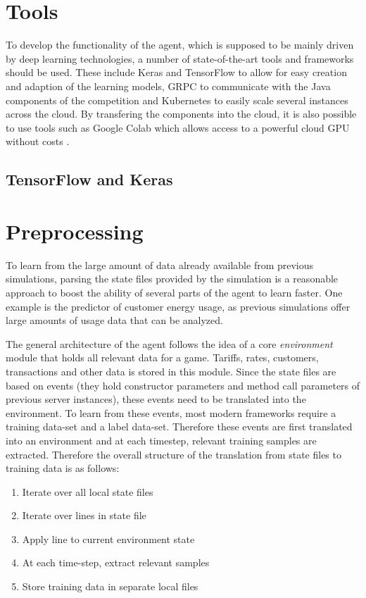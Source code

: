\section{Tools}

To develop the functionality of the agent, which is supposed to be mainly driven by deep learning technologies, a number
of state-of-the-art tools and frameworks should be used. These include Keras and TensorFlow to allow for easy creation
and adaption of the learning models, \ac {GRPC} to communicate with the Java components of the competition and
Kubernetes to easily scale several instances across the cloud. By transfering the components into the cloud, it is also
possible to use tools such as Google Colab which allows access to a powerful cloud \ac {GPU} without costs
\citep[]{GoogleColabOnline2018} .%


\subsection{TensorFlow and Keras}

\section{Preprocessing}

To learn from the large amount of data already available from previous simulations, parsing the state files provided by
the simulation is a reasonable approach to boost the ability of several parts of the agent to learn faster. One example
is the predictor of customer energy usage, as previous simulations offer large amounts of usage data that can be
analyzed.

The general architecture of the agent follows the idea of a core \emph{environment} module that holds all relevant data
for a game. Tariffs, rates, customers, transactions and other data is stored in this module. Since the state files are
based on events (they hold constructor parameters and method call parameters of previous server instances), these events
need to be translated into the environment. To learn from these events, most modern frameworks require a training
data-set and a label data-set. Therefore these events are first translated into an environment and at each timestep,
relevant training samples are extracted. Therefore the overall structure of the translation from state files to training
data is as follows:

\begin{enumerate} \item Iterate over all local state files \item Iterate over lines in state file \item Apply line to
current environment state \item At each time-step, extract relevant samples \item Store training data in separate local
files \end{enumerate}

